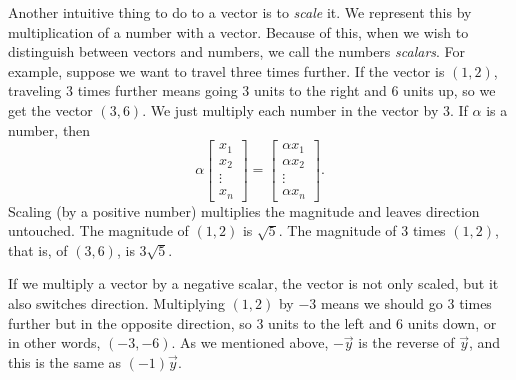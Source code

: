 \begin{myfig}
\capstart
{}
\caption{Subtraction, the vector $(1,2)$, drawn dotted, minus $(-2,1)$,
drawn dashed.  The
result, $(3,1)$, is drawn as a solid arrow.\label{linalg-vecsub:fig}}
\end{myfig}

Another intuitive thing to do to a vector is to
\emph{scale} it.
We represent this by multiplication of a number with a vector.
Because of this, when we wish to distinguish between vectors and numbers, we
call the numbers \emph{scalars}.
For example,
suppose we want to travel three times further.  If the vector is $(1,2)$,
traveling 3 times further means going 3 units to the right and 6 units up,
so we get the vector $(3,6)$.
We just multiply each number in the vector by 3.
If $\alpha$ is a number, then
\begin{equation*}
\alpha
\begin{bmatrix}
x_{1} \\ x_2 \\ \vdots \\ x_n
\end{bmatrix} =
\begin{bmatrix}
\alpha x_{1} \\ \alpha x_2 \\ \vdots \\ \alpha x_n
\end{bmatrix} .
\end{equation*}
Scaling (by a positive number) multiplies the magnitude
and leaves direction untouched.
The magnitude of $(1,2)$
is $\sqrt{5}$.  The magnitude of 3 times $(1,2)$, that is, of $(3,6)$, is
$3\sqrt{5}$.

If we multiply a vector by a negative scalar,
the
vector is not only scaled, but it also switches direction.
Multiplying $(1,2)$ by $-3$ means we should go 3 times further but in the
opposite direction, so 3 units to the left and 6 units down, or in other
words, $(-3,-6)$.  As we mentioned above, $-\vec{y}$ is the reverse of
$\vec{y}$, and this is the same as $(-1)\vec{y}$.

